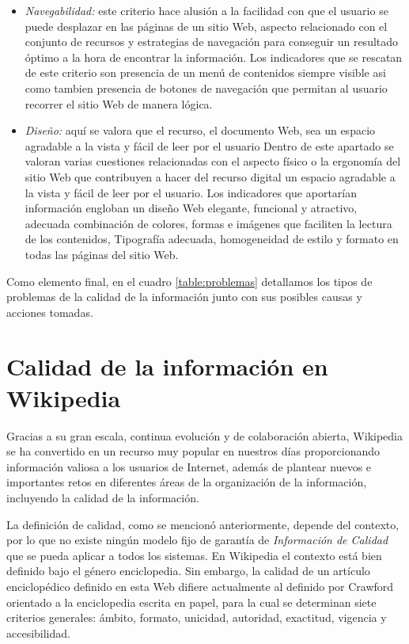 \begin{itemize}
\item \emph{Navegabilidad:} este criterio hace alusi\'on a la facilidad con que el usuario se puede desplazar en las p\'aginas de un sitio Web, aspecto relacionado con el conjunto de recursos y estrategias de navegaci\'on para conseguir un resultado \'optimo a la hora de encontrar la informaci\'on. Los indicadores que se rescatan de este criterio son presencia de un men\'u de contenidos siempre visible asi como tambien presencia de botones de navegaci\'on que permitan al usuario recorrer el sitio Web de manera l\'ogica.
\item \emph{Dise\~no:} aqu\'i se valora que el recurso, el documento Web, sea un espacio agradable a la vista y f\'acil de leer por el usuario
Dentro de este apartado se valoran varias cuestiones relacionadas con el aspecto f\'isico o la ergonom\'ia del sitio Web que contribuyen a hacer del recurso digital un espacio agradable a la vista y f\'acil de leer por el usuario. Los indicadores que aportar\'ian informaci\'on engloban un dise\~no Web elegante, funcional y atractivo, adecuada combinaci\'on de colores, formas e im\'agenes que faciliten la lectura de los contenidos, Tipograf\'ia adecuada, homogeneidad de estilo y formato en todas las p\'aginas del sitio Web. ~\cite{MaPiMo:11}
\end{itemize}

Como elemento final, en el cuadro \ref{table:problemas} detallamos los tipos de problemas de la calidad de la informaci\'on junto con sus posibles causas y acciones tomadas.

\section{Calidad de la informaci\'on en Wikipedia}

Gracias a su gran escala, continua evoluci\'on y de colaboraci\'on abierta, Wikipedia se ha convertido en un recurso muy popular en nuestros d\'ias proporcionando informaci\'on valiosa a los usuarios de Internet, adem\'as de plantear nuevos e importantes retos en diferentes \'areas de la organizaci\'on de la informaci\'on, incluyendo la calidad de la informaci\'on.

La definici\'on de calidad, como se mencion\'o anteriormente, depende del contexto, por lo que no existe ning\'un modelo fijo de garant\'ia de \emph{Informaci\'on de Calidad} que se pueda aplicar a todos los sistemas. En Wikipedia el contexto est\'a bien definido bajo el g\'enero enciclopedia. Sin embargo, la calidad de un art\'iculo enciclop\'edico definido en esta Web difiere actualmente al definido por Crawford ~\cite{Crawf:01} orientado a la enciclopedia escrita en papel, para la cual se determinan siete criterios generales: \'ambito, formato, unicidad, autoridad, exactitud, vigencia y accesibilidad. \\

